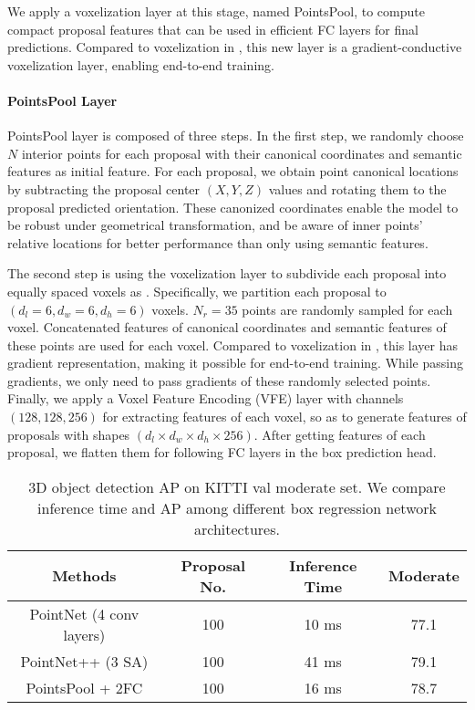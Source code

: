\documentclass[10pt,twocolumn,letterpaper]{article}
\begin{document}
We apply a voxelization layer at this stage, named PointsPool, to compute compact proposal features that can be used in efficient FC layers for final predictions. Compared to voxelization in \cite{VOXELNET}, this new layer is a gradient-conductive voxelization layer, enabling end-to-end training.






\vspace{-0.1in}
\paragraph{PointsPool Layer}
PointsPool layer is composed of three steps. In the first step, we randomly choose $N$ interior points for each proposal with their canonical coordinates and semantic features as initial feature. For each proposal, we obtain point canonical locations by subtracting the proposal center $(X,Y,Z)$ values and rotating them to the proposal predicted orientation. These canonized coordinates enable the model to be robust under geometrical transformation, and be aware of inner points' relative locations for better performance than only using semantic features.

The second step is using the voxelization layer to subdivide each proposal into equally spaced voxels as \cite{VOXELNET}. Specifically, we partition each proposal to $(d_l=6, d_w=6, d_h=6)$ voxels. $N_r=35$ points are randomly sampled for each voxel. Concatenated features of canonical coordinates and semantic features of these points are used for each voxel. Compared to voxelization in \cite{VOXELNET}, this layer has gradient representation, making it possible for end-to-end training. While passing gradients, we only need to pass gradients of these randomly selected points. Finally, we apply a Voxel Feature Encoding (VFE) layer with channels $(128, 128, 256)$ \cite{VOXELNET} for extracting features of each voxel, so as to generate features of proposals with shapes $(d_l \times d_w \times d_h \times 256)$. 
After getting features of each proposal, we flatten them for following FC layers in the box prediction head. 

\begin{table}[t]
   \centering \addtolength{\tabcolsep}{-1pt}
   \footnotesize
   \begin{tabular}{|c|c|c|c|}
       \hline
       Methods & Proposal No. & Inference Time & Moderate \\
       \hline
       PointNet (4 conv layers) & 100 & 10 ms& 77.1  \\
       PointNet++ (3 SA) & 100 & 41 ms & 79.1 \\
       PointsPool + 2FC & 100 & 16 ms & 78.7 \\
      \hline
   \end{tabular}\vspace{0.3cm}
   \caption{3D object detection AP on KITTI val moderate set. We compare inference time and AP among different box regression network architectures.}
   \label{tab:whether_pointspool}
\end{table} 
\end{document}
